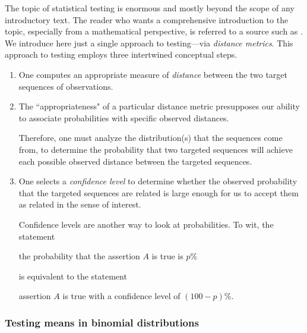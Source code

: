 The topic of statistical testing is enormous and mostly beyond the scope of any introductory text.  The reader who wants a comprehensive introduction to the topic, especially from a mathematical perspective, is referred to a source such as \cite{Hoel58}.   We introduce here just a single approach to testing---via {\em distance metrics}.  This approach to testing employs three intertwined conceptual steps.
\begin{enumerate}
\item
One computes an appropriate measure of {\em distance} between the two target sequences of observations.
\item
The ``appropriateness" of a particular distance metric presupposes our ability to associate probabilities with specific observed distances.

\smallskip

Therefore, one must analyze the distribution(s) that the sequences come from, to determine the probability that two targeted sequences will achieve each possible observed distance between the targeted sequences.
\item
One selects a {\em confidence level} to determine whether the observed probability that the targeted sequences are related is large enough for us to accept them as related in the sense of interest.

\smallskip

Confidence levels are another way to look at probabilities.  To wit, the statement

\hspace*{.2in}the probability that the assertion $A$ is true is $p\%$

is equivalent to the statement

\hspace*{.2in}assertion $A$ is true with a confidence level of $(100-p)\%$.
\end{enumerate}

\medskip

\noindent {}

\subsubsection{Testing means in binomial distributions}

